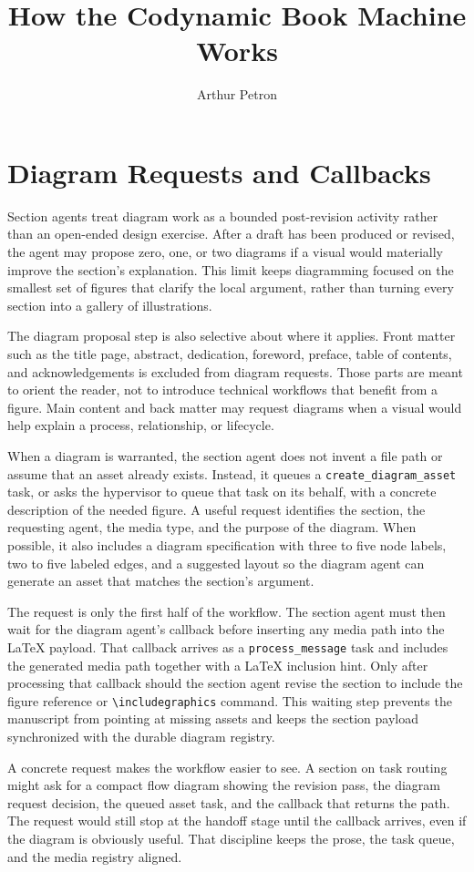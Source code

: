 \documentclass[11pt]{article}
\title{How the Codynamic Book Machine Works}
\author{Arthur Petron}
\begin{document}
\section*{Diagram Requests and Callbacks}

Section agents treat diagram work as a bounded post-revision activity rather than an open-ended design exercise. After a draft has been produced or revised, the agent may propose zero, one, or two diagrams if a visual would materially improve the section's explanation. This limit keeps diagramming focused on the smallest set of figures that clarify the local argument, rather than turning every section into a gallery of illustrations.

The diagram proposal step is also selective about where it applies. Front matter such as the title page, abstract, dedication, foreword, preface, table of contents, and acknowledgements is excluded from diagram requests. Those parts are meant to orient the reader, not to introduce technical workflows that benefit from a figure. Main content and back matter may request diagrams when a visual would help explain a process, relationship, or lifecycle.

When a diagram is warranted, the section agent does not invent a file path or assume that an asset already exists. Instead, it queues a \texttt{create\_diagram\_asset} task, or asks the hypervisor to queue that task on its behalf, with a concrete description of the needed figure. A useful request identifies the section, the requesting agent, the media type, and the purpose of the diagram. When possible, it also includes a diagram specification with three to five node labels, two to five labeled edges, and a suggested layout so the diagram agent can generate an asset that matches the section's argument.

The request is only the first half of the workflow. The section agent must then wait for the diagram agent's callback before inserting any media path into the LaTeX payload. That callback arrives as a \texttt{process\_message} task and includes the generated media path together with a LaTeX inclusion hint. Only after processing that callback should the section agent revise the section to include the figure reference or \texttt{\textbackslash includegraphics} command. This waiting step prevents the manuscript from pointing at missing assets and keeps the section payload synchronized with the durable diagram registry.

A concrete request makes the workflow easier to see. A section on task routing might ask for a compact flow diagram showing the revision pass, the diagram request decision, the queued asset task, and the callback that returns the path. The request would still stop at the handoff stage until the callback arrives, even if the diagram is obviously useful. That discipline keeps the prose, the task queue, and the media registry aligned.
\end{document}
